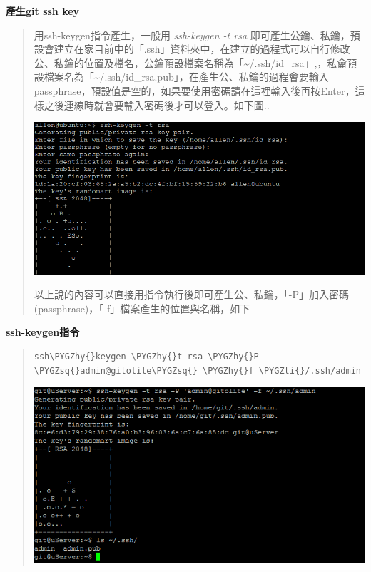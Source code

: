 \documentclass[letterpaper,10pt,english]{sphinxmanual}
\def\PYGZhy{\char`\-}
\def\PYGZsq{\char`\'}
\def\PYGZti{\char`\~}
\begin{document}
\textbf{產生git ssh key}
\begin{quote}

用ssh-keygen指令產生，一般用 \emph{ssh-keygen -t rsa} 即可產生公鑰、私鑰，預設會建立在家目前中的「.ssh」資料夾中，在建立的過程式可以自行修改公、私鑰的位置及檔名，公鑰預設檔案名稱為「\textasciitilde{}/.ssh/id\_rsa」,，私龠預設檔案名為「\textasciitilde{}/.ssh/id\_rsa.pub」，在產生公、私鑰的過程會要輸入passphrase，預設值是空的，如果要使用密碼請在這裡輸入後再按Enter，這樣之後連線時就會要輸入密碼後才可以登入。如下圖..

\includegraphics{ssh-keygen.png}

以上說的內容可以直接用指令執行後即可產生公、私鑰，「-P」加入密碼(passphrase)，「-f」檔案產生的位置與名稱，如下
\end{quote}

\textbf{ssh-keygen指令}
\begin{quote}

\begin{Verbatim}[commandchars=\\\{\}]
ssh\PYGZhy{}keygen \PYGZhy{}t rsa \PYGZhy{}P \PYGZsq{}admin@gitolite\PYGZsq{} \PYGZhy{}f \PYGZti{}/.ssh/admin
\end{Verbatim}

\includegraphics{ssh-keygen2.png}
\end{quote}
\end{document}
